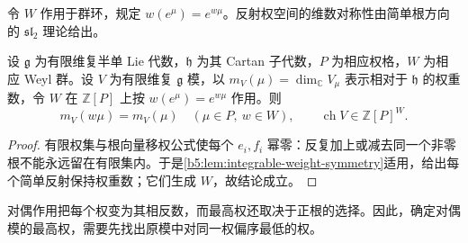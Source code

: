 令 \(W\) 作用于群环，规定 \(w(e^\mu)=e^{w\mu}\)。反射权空间的维数对称性由简单根方向的 \(\mathfrak{sl}_2\) 理论给出。

\begin{proposition}\label{b5:prop:formal-character-weyl-invariant}
	设 \(\mathfrak g\) 为有限维复半单 Lie 代数，\(\mathfrak h\) 为其 Cartan 子代数，\(P\) 为相应权格，\(W\) 为相应 Weyl 群。设 \(V\) 为有限维复 \(\mathfrak g\) 模，以 \(m_V(\mu)=\dim_{\mathbb C}V_\mu\) 表示相对于 \(\mathfrak h\) 的权重数，令 \(W\) 在 \(\mathbb Z[P]\) 上按 \(w(e^\mu)=e^{w\mu}\) 作用。则
	\[
		m_V(w\mu)=m_V(\mu)\quad(\mu\in P,\ w\in W), \qquad \operatorname{ch}V\in\mathbb Z[P]^W.
	\]
\end{proposition}
\begin{proof}
	有限权集与根向量移权公式使每个 \(e_i,f_i\) 幂零：反复加上或减去同一个非零根不能永远留在有限集内。于是\cref{b5:lem:integrable-weight-symmetry}适用，给出每个简单反射保持权重数；它们生成 \(W\)，故结论成立。
\end{proof}

对偶作用把每个权变为其相反数，而最高权还取决于正根的选择。因此，确定对偶模的最高权，需要先找出原模中对同一权偏序最低的权。

